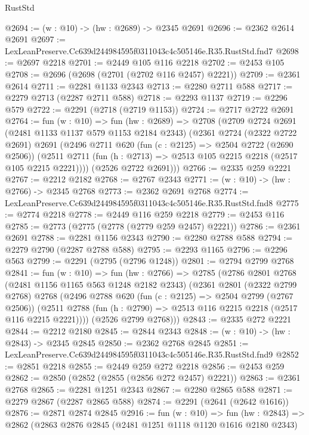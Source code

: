 \begin{lexlean}{RustStd}
\begin{coremodule}
@2694 := (w : @10) -> (hw : @2689) -> @2345 @2691
@2696 := @2362 @2614 @2691
@2697 := LexLeanPreserve.Cc639d244984595f0311043c4c505146e.R35.RustStd.fnd7
@2698 := @2697 @2218
@2701 := @2449 @105 @116 @2218
@2702 := @2453 @105
@2708 := @2696 (@2698 (@2701 (@2702 @116 @2457) @2221))
@2709 := @2361 @2614
@2711 := @2281 @1133 @2343
@2713 := @2280 @2711 @588
@2717 := @2279 @2713 (@2287 @2711 @588)
@2718 := @2293 @1137
@2719 := @2296 @579
@2722 := @2291 (@2718 (@2719 @1153))
@2724 := @2717 @2722 @2691
@2764 := fun (w : @10) =>
  fun (hw : @2689) =>
  @2708
    (@2709
      @2724
      @2691
      (@2481 @1133 @1137 @579 @1153 @2184 @2343)
      (@2361
        @2724
        (@2322 @2722 @2691)
        @2691
        (@2496
          @2711
          @620
          (fun (c : @2125) => @2504 @2722 (@2690 @2506))
          (@2511 @2711 (fun (h : @2713) => @2513 @105 @2215 @2218 (@2517 @105 @2215 @2221))))
        (@2526 @2722 @2691)))
@2766 := @2335 @259 @2221
@2767 := @2212 @2182
@2768 := @2767 @2343
@2771 := (w : @10) -> (hw : @2766) -> @2345 @2768
@2773 := @2362 @2691 @2768
@2774 := LexLeanPreserve.Cc639d244984595f0311043c4c505146e.R35.RustStd.fnd8
@2775 := @2774 @2218
@2778 := @2449 @116 @259 @2218
@2779 := @2453 @116
@2785 := @2773 (@2775 (@2778 (@2779 @259 @2457) @2221))
@2786 := @2361 @2691
@2788 := @2281 @1156 @2343
@2790 := @2280 @2788 @588
@2794 := @2279 @2790 (@2287 @2788 @588)
@2795 := @2293 @1165
@2796 := @2296 @563
@2799 := @2291 (@2795 (@2796 @1248))
@2801 := @2794 @2799 @2768
@2841 := fun (w : @10) =>
  fun (hw : @2766) =>
  @2785
    (@2786
      @2801
      @2768
      (@2481 @1156 @1165 @563 @1248 @2182 @2343)
      (@2361
        @2801
        (@2322 @2799 @2768)
        @2768
        (@2496
          @2788
          @620
          (fun (c : @2125) => @2504 @2799 (@2767 @2506))
          (@2511 @2788 (fun (h : @2790) => @2513 @116 @2215 @2218 (@2517 @116 @2215 @2221))))
        (@2526 @2799 @2768)))
@2843 := @2335 @272 @2221
@2844 := @2212 @2180
@2845 := @2844 @2343
@2848 := (w : @10) -> (hw : @2843) -> @2345 @2845
@2850 := @2362 @2768 @2845
@2851 := LexLeanPreserve.Cc639d244984595f0311043c4c505146e.R35.RustStd.fnd9
@2852 := @2851 @2218
@2855 := @2449 @259 @272 @2218
@2856 := @2453 @259
@2862 := @2850 (@2852 (@2855 (@2856 @272 @2457) @2221))
@2863 := @2361 @2768
@2865 := @2281 @1251 @2343
@2867 := @2280 @2865 @588
@2871 := @2279 @2867 (@2287 @2865 @588)
@2874 := @2291 (@2641 (@2642 @1616))
@2876 := @2871 @2874 @2845
@2916 := fun (w : @10) =>
  fun (hw : @2843) =>
  @2862
    (@2863
      @2876
      @2845
      (@2481 @1251 @1118 @1120 @1616 @2180 @2343)

\end{coremodule}
\end{lexlean}
